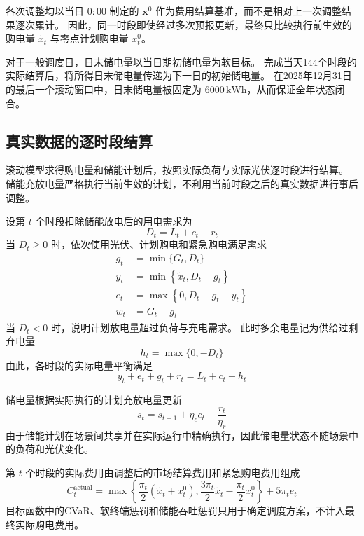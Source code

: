 各次调整均以当日 \(0{:}00\) 制定的
\(\boldsymbol{x}^{0}\) 作为费用结算基准，而不是相对上一次调整结果逐次累计。
因此，同一时段即使经过多次预报更新，最终只比较执行前生效的购电量
\(\widetilde{x}_t\) 与零点计划购电量 \(x_t^0\)。

对于一般调度日，日末储电量以当日期初储电量为软目标。
完成当天144个时段的实际结算后，将所得日末储电量传递为下一日的初始储电量。
在2025年12月31日的最后一个滚动窗口中，日末储电量被固定为
\(6000\,\mathrm{kWh}\)，从而保证全年状态闭合。

\subsection{真实数据的逐时段结算}

滚动模型求得购电量和储能计划后，按照实际负荷与实际光伏逐时段进行结算。
储能充放电量严格执行当前生效的计划，不利用当前时段之后的真实数据进行事后调整。

设第 \(t\) 个时段扣除储能放电后的用电需求为
\begin{equation}
D_t=L_t+c_t-r_t
\label{eq:app_q3_net_demand}
\end{equation}
当 \(D_t\geq0\) 时，依次使用光伏、计划购电和紧急购电满足需求
\begin{equation}
\begin{aligned}
g_t&=\min\{G_t,D_t\} \\
y_t&=\min\left\{\widetilde{x}_t,D_t-g_t\right\} \\
e_t&=\max\left\{0,D_t-g_t-y_t\right\} \\
w_t&=G_t-g_t
\end{aligned}
\label{eq:app_q3_actual_settlement}
\end{equation}
当 \(D_t<0\) 时，说明计划放电量超过负荷与充电需求。
此时多余电量记为供给过剩弃电量
\begin{equation}
h_t=\max\{0,-D_t\}
\label{eq:app_q3_spill}
\end{equation}
由此，各时段的实际电量平衡满足
\begin{equation}
y_t+e_t+g_t+r_t
=
L_t+c_t+h_t
\label{eq:app_q3_actual_balance}
\end{equation}

储电量根据实际执行的计划充放电量更新
\begin{equation}
s_t=s_{t-1}+\eta_c c_t-\frac{r_t}{\eta_r}
\label{eq:app_q3_actual_soc}
\end{equation}
由于储能计划在场景间共享并在实际运行中精确执行，因此储电量状态不随场景中的负荷和光伏变化。

第 \(t\) 个时段的实际费用由调整后的市场结算费用和紧急购电费用组成
\begin{equation}
C_t^{\mathrm{actual}}
=
\max\left\{
\frac{\pi_t}{2}\left(\widetilde{x}_t+x_t^0\right),
\frac{3\pi_t}{2}\widetilde{x}_t-\frac{\pi_t}{2}x_t^0
\right\}
+
5\pi_t e_t
\label{eq:app_q3_actual_cost}
\end{equation}
目标函数中的CVaR、软终端惩罚和储能吞吐惩罚只用于确定调度方案，不计入最终实际购电费用。

